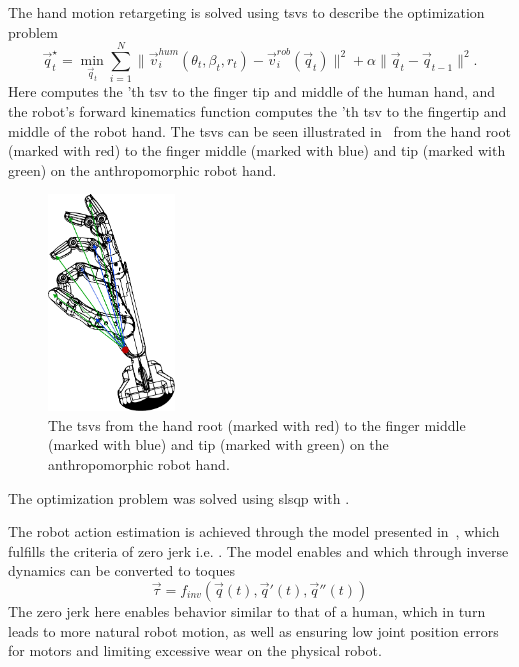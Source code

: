 The hand motion retargeting is solved using \gls{tsv}s to describe the optimization problem
\begin{equation}
    \vec{q}^\star_t = \min_{\vec{q}_t} \sum^N_{i=1}\| \vec{v}^{hum}_i(\theta_t,\beta_t,r_t)-\vec{v}^{rob}_i(\vec{q}_t)\|^2+\alpha \| \vec{q}_t - \vec{q}_{t-1} \|^2.
\end{equation}
Here  computes the 'th \gls{tsv} to the finger tip and middle of the human hand, and the robot's forward kinematics function  computes the 'th \gls{tsv} to the fingertip and middle of the robot hand. The \gls{tsv}s can be seen illustrated in~ from the hand root (marked with red) to the finger middle (marked with blue) and tip (marked with green) on the anthropomorphic robot hand.\medskip

\begin{figure}[!h]
	\begin{center}
		\includegraphics[width=0.3\textwidth]{chapters/3-in-hand-manipulation/fig/tsv.pdf}
	\end{center}
	\caption{The \gls{tsv}s from the hand root (marked with red) to the finger middle (marked with blue) and tip (marked with green) on the anthropomorphic robot hand.}
	\label{fig:tsv}
\end{figure}

The optimization problem was solved using \gls{slsqp} with .\medskip

The robot action estimation is achieved through the model  presented in~\cite{smoothness-maximization-along-a-predefined-path-accurately-predicts-the-speed-profiles-of-complex-arm-movements}, which fulfills the criteria of zero jerk i.e. . The model enables  and  which through inverse dynamics can be converted to toques \mvar{\vec{\tau}}
\begin{equation}
    \vec{\tau} = f_{inv}\left(\vec{q}(t),\vec{q}'(t),\vec{q}''(t)\right)
\end{equation}
The zero jerk here enables behavior similar to that of a human, which in turn leads to more natural robot motion, as well as ensuring low joint position errors for motors and limiting excessive wear on the physical robot.

